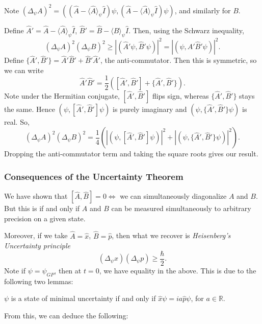 \documentclass[12pt]{article}
\begin{document}
\begin{proofbox}
	Note $(\Delta_{\psi}A)^2 = ((\hat A - \langle \hat A \rangle_{\psi} \hat I) \psi, (\hat A - \langle \hat A \rangle_{\psi} \hat I)\psi)$, and similarly for $B$.

	Define $\hat A' = \hat A - \langle \hat A \rangle_{\psi} \hat I$, $\hat B' = \hat B - \langle \hat B \rangle_{\psi} \hat I$. Then, using the Schwarz inequality,
	\[
		(\Delta_{\psi}A)^2(\Delta_{\psi}B)^2 \geq |(\hat A' \psi, \hat B' \psi)|^2 = |(\psi, \hat A' \hat B' \psi)|^2
	.\]
	Define $\{\hat A', \hat B'\} = \hat A' \hat B' + \hat B' \hat A'$, the anti-commutator. Then this is symmetric, so we can write
	\[
		\hat A' \hat B' = \frac{1}{2} ([\hat A', \hat B'] + \{\hat A', \hat B'\})
	.\]
	Note under the Hermitian conjugate, $[\hat A', \hat B']$ flips sign, whereas $\{\hat A', \hat B'\}$ stays the same. Hence $(\psi, [\hat A', \hat B']\psi)$ is purely imaginary and $(\psi, \{\hat A', \hat B'\}\psi)$ is real. So,
	\[
		(\Delta_{\psi} A)^2 (\Delta_{\psi}B)^2 = \frac{1}{4} (|(\psi, [\hat A', \hat B']\psi)|^2 + |(\psi, \{\hat A', \hat B'\}\psi)|^2)
	.\]
	Dropping the anti-commutator term and taking the square roots gives our result.
\end{proofbox}

\subsubsection{Consequences of the Uncertainty Theorem}%
\label{subsub:consequences_of_the_uncertainty_theorem}

We have shown that $[ \hat A, \hat B] = 0 \iff$ we can simultaneously diagonalize $A$ and $B$. But this is if and only if $A$ and $B$ can be measured simultaneously to arbitrary precision on a given state.

Moreover, if we take $\hat A = \hat x$, $\hat B = \hat p$, then what we recover is \textit{Heisenberg's Uncertainty principle}
\[
	(\Delta_{\psi} x)(\Delta_{\psi} p) \geq \frac{\hbar}{2}
.\]
Note if $\psi = \psi_{GP}$, then at $t = 0$, we have equality in the above. This is due to the following two lemmas:

\begin{lemma}
	$\psi$ is a state of minimal uncertainty if and only if $\hat x \psi = ia \hat p \psi$, for $a \in \mathbb{R}$.
\end{lemma}

From this, we can deduce the following:
\end{document}

